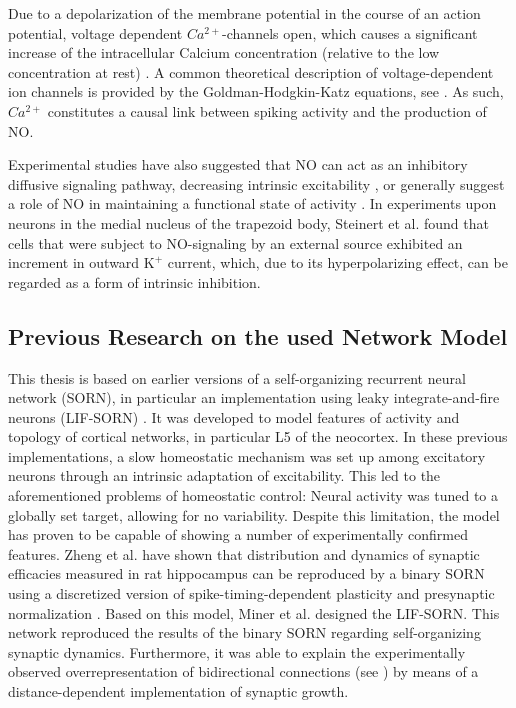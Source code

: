 \documentclass[10pt,a4paper]{article}
\begin{document}
Due to a depolarization of the membrane potential in the course of an action potential, voltage dependent $Ca^{2+}$-channels open, which causes a significant increase of the intracellular Calcium concentration (relative to the low concentration at rest) \cite[p.~98-100]{Hille_Ion_Channels}. A common theoretical description of voltage-dependent ion channels is provided by the Goldman-Hodgkin-Katz equations, see \cite[p.~445-451]{Hille_Ion_Channels}. As such, $Ca^{2+}$ constitutes a causal link between spiking activity and the production of NO.

Experimental studies have also suggested that NO can act as an inhibitory diffusive signaling pathway, decreasing intrinsic excitability \cite{Steinert_NO_2011}, or generally suggest a role of NO in maintaining a functional state of activity \cite{Pape_NO}. In experiments upon neurons in the medial nucleus of the trapezoid body, Steinert et al. found that cells that were subject to NO-signaling by an external source exhibited an increment in outward $\mathrm{K^+}$ current, which, due to its hyperpolarizing effect, can be regarded as a form of intrinsic inhibition. 

\subsection{Previous Research on the used Network Model}
This thesis is based on earlier versions of a self-organizing recurrent neural network (SORN), in particular an implementation using leaky integrate-and-fire neurons (LIF-SORN) \cite{SORN_Paper}. It was developed to model features of activity and topology of cortical networks, in particular L5 of the neocortex. In these previous implementations, a slow homeostatic mechanism was set up among excitatory neurons through an intrinsic adaptation of excitability. This led to the aforementioned problems of homeostatic control: Neural activity was tuned to a globally set target, allowing for no variability. Despite this limitation, the model has proven to be capable of showing a number of experimentally confirmed features. Zheng et al. have shown that distribution and dynamics of synaptic efficacies measured in rat hippocampus can be reproduced by a binary SORN using a discretized version of spike-timing-dependent plasticity and presynaptic normalization \cite{Pengsheng_2013}. Based on this model, Miner et al. designed the LIF-SORN. This network reproduced the results of the binary SORN regarding self-organizing synaptic dynamics. Furthermore, it was able to explain the experimentally observed overrepresentation of bidirectional connections (see \cite{Markram_Connections_1997,Song_Connectivity_2005}) by means of a distance-dependent implementation of synaptic growth.
\end{document}
